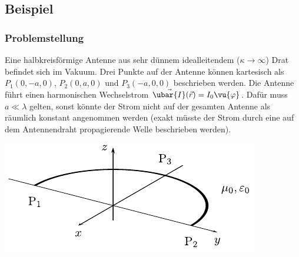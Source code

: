 	\subsection{Beispiel}
	\subsubsection{Problemstellung}
	Eine halbkreisförmige Antenne aus sehr dünnem idealleitendem ($\kappa\to\infty$) Drat befindet sich im Vakuum. Drei Punkte auf der Antenne können kartesisch als $P_1(0,-a,0)$, $P_2(0,a,0)$ und $P_3(-a,0,0)$ beschrieben werden. Die Antenne führt einen harmonischen Wechselstrom $\vec{\ubar{I}}(\vec{r})=I_0\vu{\varphi}$. Dafür muss $a\ll\lambda$ gelten, sonst könnte der Strom nicht auf der gesamten Antenne als räumlich konstant angenommen werden (exakt müsste der Strom durch eine auf dem Antennendraht propagierende Welle beschrieben werden).
	\begin{center}
			\includegraphics{res/ANTbsp.pdf}
	\end{center}
